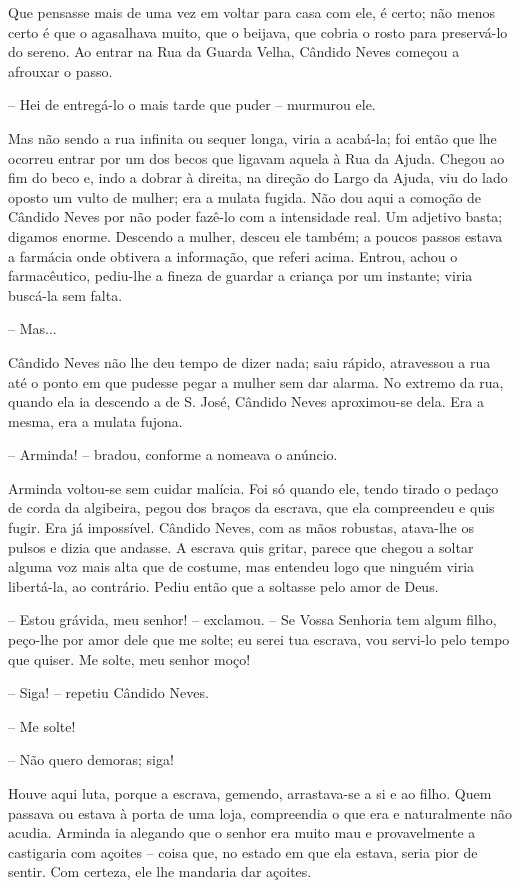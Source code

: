 Que pensasse mais de uma vez em voltar para casa com ele, é certo; não
menos certo é que o agasalhava muito, que o beijava, que cobria o rosto
para preservá-lo do sereno. Ao entrar na Rua da Guarda Velha, Cândido
Neves começou a afrouxar o passo.

-- Hei de entregá-lo o mais tarde que puder -- murmurou ele.

Mas não sendo a rua infinita ou sequer longa, viria a acabá-la; foi
então que lhe ocorreu entrar por um dos becos que ligavam aquela à Rua
da Ajuda. Chegou ao fim do beco e, indo a dobrar à direita, na direção
do Largo da Ajuda, viu do lado oposto um vulto de mulher; era a mulata
fugida. Não dou aqui a comoção de Cândido Neves por não poder fazê-lo
com a intensidade real. Um adjetivo basta; digamos enorme. Descendo a
mulher, desceu ele também; a poucos passos estava a farmácia onde
obtivera a informação, que referi acima. Entrou, achou o farmacêutico,
pediu-lhe a fineza de guardar a criança por um instante; viria buscá-la
sem falta.

-- Mas...

Cândido Neves não lhe deu tempo de dizer nada; saiu rápido, atravessou a
rua até o ponto em que pudesse pegar a mulher sem dar alarma. No extremo
da rua, quando ela ia descendo a de S. José, Cândido Neves aproximou-se
dela. Era a mesma, era a mulata fujona.

-- Arminda! -- bradou, conforme a nomeava o anúncio.

Arminda voltou-se sem cuidar malícia. Foi só quando ele, tendo tirado o
pedaço de corda da algibeira, pegou dos braços da escrava, que ela
compreendeu e quis fugir. Era já impossível. Cândido Neves, com as mãos
robustas, atava-lhe os pulsos e dizia que andasse. A escrava quis
gritar, parece que chegou a soltar alguma voz mais alta que de costume,
mas entendeu logo que ninguém viria libertá-la, ao contrário. Pediu
então que a soltasse pelo amor de Deus.

-- Estou grávida, meu senhor! -- exclamou. -- Se Vossa Senhoria tem
algum filho, peço-lhe por amor dele que me solte; eu serei tua escrava,
vou servi-lo pelo tempo que quiser. Me solte, meu senhor moço!

-- Siga! -- repetiu Cândido Neves.

-- Me solte!

-- Não quero demoras; siga!

Houve aqui luta, porque a escrava, gemendo, arrastava-se a si e ao
filho. Quem passava ou estava à porta de uma loja, compreendia o que era
e naturalmente não acudia. Arminda ia alegando que o senhor era muito
mau e provavelmente a castigaria com açoites -- coisa que, no estado em
que ela estava, seria pior de sentir. Com certeza, ele lhe mandaria dar
açoites.


